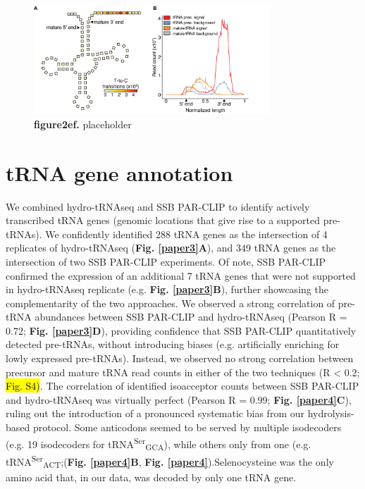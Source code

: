 \documentclass[12pt]{rockefeller}
\begin{document}
\begin{figure}[!ht]%
\centering
\includegraphics[width=3.5in]{paper2ef.png}%
\caption[figure2ef]
{\textbf{figure2ef.}
placeholder}
\centering
\label{paper2ef}%
\end{figure}

\section{tRNA gene annotation}
We combined hydro-tRNAseq and SSB PAR-CLIP to identify actively transcribed tRNA genes (genomic locations that give rise to a supported pre-tRNAs). We confidently identified 288 tRNA genes as the intersection of 4 replicates of hydro-tRNAseq (\textbf{Fig. \ref{paper3}A}), and 349 tRNA genes as the intersection of two SSB PAR-CLIP experiments. Of note, SSB PAR-CLIP confirmed the expression of an additional 7 tRNA genes that were not supported in hydro-tRNAseq replicate (e.g. \textbf{Fig. \ref{paper3}B}), further showcasing the complementarity of the two approaches. We observed a strong correlation of pre-tRNA abundances between SSB PAR-CLIP and hydro-tRNAseq (Pearson R = 0.72; \textbf{Fig. \ref{paper3}D}), providing confidence that SSB PAR-CLIP quantitatively detected pre-tRNAs, without introducing biases (e.g. artificially enriching for lowly expressed pre-tRNAs). Instead, we observed no strong correlation between precursor and mature tRNA read counts in either of the two techniques (R < 0.2; \hl{Fig. S4)}. The correlation of identified isoacceptor counts between SSB PAR-CLIP and hydro-tRNAseq was virtually perfect (Pearson R = 0.99; \textbf{Fig. \ref{paper4}C}), ruling out the introduction of a pronounced systematic bias from our hydrolysis-based protocol. Some anticodons seemed to be served by multiple isodecoders (e.g. 19 isodecoders for tRNA\textsuperscript{Ser}\textsubscript{GCA}), while others only from one (e.g. tRNA\textsuperscript{Ser}\textsubscript{ACT};(\textbf{Fig. \ref{paper4}B}, \textbf{Fig. \ref{paper4}}).Selenocysteine was the only amino acid that, in our data, was decoded by only one tRNA gene.
\end{document}
